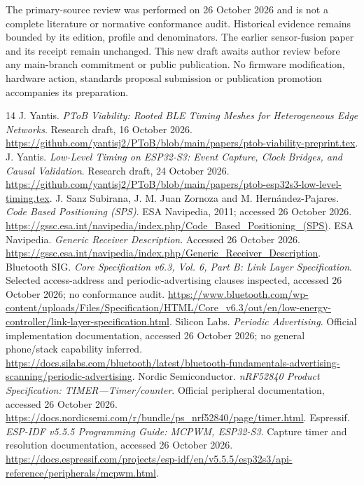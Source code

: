 \documentclass[11pt,letterpaper]{article}
\begin{document}
The primary-source review was performed on 26 October 2026 and is not a complete literature or normative conformance audit. Historical evidence remains bounded by its edition, profile and denominators. The earlier sensor-fusion paper and its receipt remain unchanged. This new draft awaits author review before any main-branch commitment or public publication. No firmware modification, hardware action, standards proposal submission or publication promotion accompanies its preparation.

\begin{thebibliography}{14}\small\setlength{\itemsep}{4pt}
 J. Yantis. \emph{PToB Viability: Rooted BLE Timing Meshes for Heterogeneous Edge Networks}. Research draft, 16 October 2026. \url{https://github.com/yantisj2/PToB/blob/main/papers/ptob-viability-preprint.tex}.
 J. Yantis. \emph{Low-Level Timing on ESP32-S3: Event Capture, Clock Bridges, and Causal Validation}. Research draft, 24 October 2026. \url{https://github.com/yantisj2/PToB/blob/main/papers/ptob-esp32s3-low-level-timing.tex}.
 J. Sanz Subirana, J. M. Juan Zornoza and M. Hern\'andez-Pajares. \emph{Code Based Positioning (SPS)}. ESA Navipedia, 2011; accessed 26 October 2026. \url{https://gssc.esa.int/navipedia/index.php/Code_Based_Positioning_(SPS)}.
 ESA Navipedia. \emph{Generic Receiver Description}. Accessed 26 October 2026. \url{https://gssc.esa.int/navipedia/index.php/Generic_Receiver_Description}.
 Bluetooth SIG. \emph{Core Specification v6.3, Vol. 6, Part B: Link Layer Specification}. Selected access-address and periodic-advertising clauses inspected, accessed 26 October 2026; no conformance audit. \url{https://www.bluetooth.com/wp-content/uploads/Files/Specification/HTML/Core_v6.3/out/en/low-energy-controller/link-layer-specification.html}.
 Silicon Labs. \emph{Periodic Advertising}. Official implementation documentation, accessed 26 October 2026; no general phone/stack capability inferred. \url{https://docs.silabs.com/bluetooth/latest/bluetooth-fundamentals-advertising-scanning/periodic-advertising}.
 Nordic Semiconductor. \emph{nRF52840 Product Specification: TIMER---Timer/counter}. Official peripheral documentation, accessed 26 October 2026. \url{https://docs.nordicsemi.com/r/bundle/ps_nrf52840/page/timer.html}.
 Espressif. \emph{ESP-IDF v5.5.5 Programming Guide: MCPWM, ESP32-S3}. Capture timer and resolution documentation, accessed 26 October 2026. \url{https://docs.espressif.com/projects/esp-idf/en/v5.5.5/esp32s3/api-reference/peripherals/mcpwm.html}.

\end{thebibliography}
\end{document}

